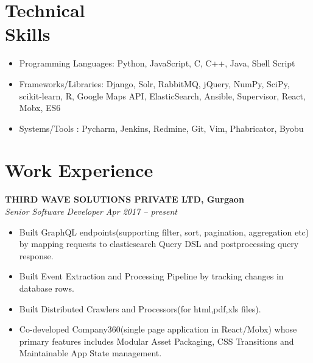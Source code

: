 \documentclass[margin,line]{resume}
\begin{document}
\begin{resume}
    \section{\mysidestyle Technical \\ Skills}
	\vspace{0mm}
     \begin{itemize}
      \item Programming Languages: Python, JavaScript, C, C++, Java, Shell Script
      \item Frameworks/Libraries: Django, Solr, RabbitMQ, jQuery, NumPy, SciPy, scikit-learn, R, Google Maps API, ElasticSearch, Ansible, Supervisor, React, Mobx, ES6
      \item Systems/Tools : Pycharm, Jenkins, Redmine, Git, Vim, Phabricator, Byobu
     \end{itemize}
    \section{\mysidestyle Work Experience}
    \textbf{THIRD WAVE SOLUTIONS PRIVATE LTD, Gurgaon}\\
           \textsl{Senior Software Developer} \hfill \textsl{Apr 2017 -- present} \vspace{1mm}%
    \begin{itemize}

            \item Built GraphQL endpoints(supporting filter, sort, pagination, aggregation etc) by mapping requests to elasticsearch Query DSL and postprocessing query response.
            \item Built Event Extraction and Processing Pipeline by tracking changes in database rows.
            \item Built Distributed Crawlers and Processors(for html,pdf,xls files).
           \item Co-developed Company360(single page application in React/Mobx) whose primary features includes Modular Asset Packaging, CSS Transitions and Maintainable App State management.
        \end{itemize}


\end{resume}
\end{document}
